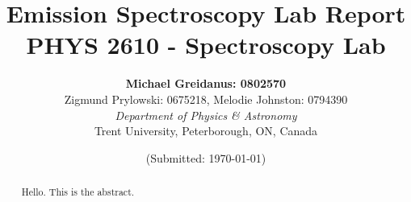 \documentclass[letterpaper,11pt] {article}
\begin{document}

\title{\textbf{Emission Spectroscopy Lab Report}\\\normalsize{PHYS 2610 - Spectroscopy Lab}}
\author{\textbf{Michael Greidanus: 0802570} \\
Zigmund Prylowski: 0675218, Melodie Johnston: 0794390
\\\emph{Department of Physics \& Astronomy}\\ Trent University, Peterborough, ON, Canada}
\date{(Submitted: \today)}
\maketitle

\begin{abstract}
    Hello. This is the abstract. 

\end{abstract}
\end{document}
